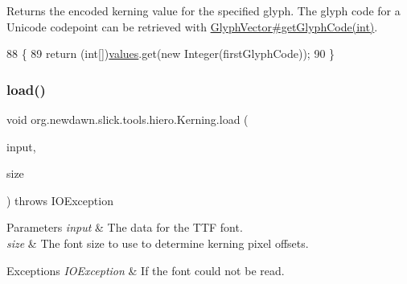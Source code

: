 Returns the encoded kerning value for the specified glyph. The glyph code for a Unicode codepoint can be retrieved with \mbox{\hyperlink{}{Glyph\+Vector\#get\+Glyph\+Code(int)}}. 
\begin{DoxyCode}
88                                                 \{
89         \textcolor{keywordflow}{return} (\textcolor{keywordtype}{int}[])\mbox{\hyperlink{classorg_1_1newdawn_1_1slick_1_1tools_1_1hiero_1_1_kerning_a2fb8954e8eb2c071e18a4e14b19ce352}{values}}.get(\textcolor{keyword}{new} Integer(firstGlyphCode));
90     \}
\end{DoxyCode}
\mbox{\label{classorg_1_1newdawn_1_1slick_1_1tools_1_1hiero_1_1_kerning_abf8ff328d00ee5187d4146203a84660f}} 
\subsubsection{\texorpdfstring{load()}{load()}}
{\footnotesize\ttfamily void org.\+newdawn.\+slick.\+tools.\+hiero.\+Kerning.\+load (\begin{DoxyParamCaption}\item[{Input\+Stream}]{input,  }\item[{int}]{size }\end{DoxyParamCaption}) throws I\+O\+Exception\hspace{0.3cm}{\ttfamily [inline]}}


\begin{DoxyParams}{Parameters}
{\em input} & The data for the T\+TF font. \\
\hline
{\em size} & The font size to use to determine kerning pixel offsets. \\
\hline
\end{DoxyParams}

\begin{DoxyExceptions}{Exceptions}
{\em I\+O\+Exception} & If the font could not be read. \\
\hline
\end{DoxyExceptions}

